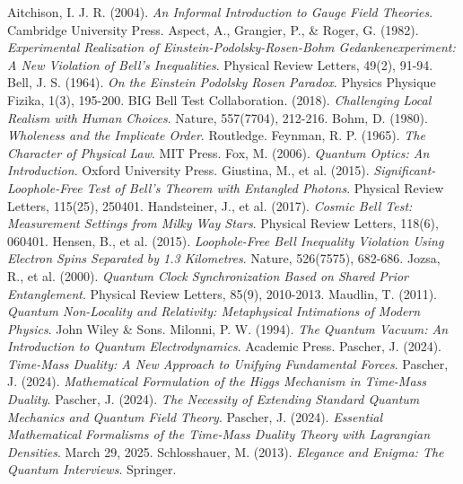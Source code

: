 \documentclass[12pt,a4paper]{article}
\begin{document}
	
	\begin{thebibliography}{99}
		 Aitchison, I. J. R. (2004). \textit{An Informal Introduction to Gauge Field Theories}. Cambridge University Press.
		 Aspect, A., Grangier, P., \& Roger, G. (1982). \textit{Experimental Realization of Einstein-Podolsky-Rosen-Bohm Gedankenexperiment: A New Violation of Bell's Inequalities}. Physical Review Letters, 49(2), 91-94.
		 Bell, J. S. (1964). \textit{On the Einstein Podolsky Rosen Paradox}. Physics Physique Fizika, 1(3), 195-200.
		 BIG Bell Test Collaboration. (2018). \textit{Challenging Local Realism with Human Choices}. Nature, 557(7704), 212-216.
		 Bohm, D. (1980). \textit{Wholeness and the Implicate Order}. Routledge.
		 Feynman, R. P. (1965). \textit{The Character of Physical Law}. MIT Press.
		 Fox, M. (2006). \textit{Quantum Optics: An Introduction}. Oxford University Press.
		 Giustina, M., et al. (2015). \textit{Significant-Loophole-Free Test of Bell's Theorem with Entangled Photons}. Physical Review Letters, 115(25), 250401.
		 Handsteiner, J., et al. (2017). \textit{Cosmic Bell Test: Measurement Settings from Milky Way Stars}. Physical Review Letters, 118(6), 060401.
		 Hensen, B., et al. (2015). \textit{Loophole-Free Bell Inequality Violation Using Electron Spins Separated by 1.3 Kilometres}. Nature, 526(7575), 682-686.
		 Jozsa, R., et al. (2000). \textit{Quantum Clock Synchronization Based on Shared Prior Entanglement}. Physical Review Letters, 85(9), 2010-2013.
		 Maudlin, T. (2011). \textit{Quantum Non-Locality and Relativity: Metaphysical Intimations of Modern Physics}. John Wiley \& Sons.
		 Milonni, P. W. (1994). \textit{The Quantum Vacuum: An Introduction to Quantum Electrodynamics}. Academic Press.
		 Pascher, J. (2024). \textit{Time-Mass Duality: A New Approach to Unifying Fundamental Forces}.
		 Pascher, J. (2024). \textit{Mathematical Formulation of the Higgs Mechanism in Time-Mass Duality}.
		 Pascher, J. (2024). \textit{The Necessity of Extending Standard Quantum Mechanics and Quantum Field Theory}.
		 Pascher, J. (2024). \textit{Essential Mathematical Formalisms of the Time-Mass Duality Theory with Lagrangian Densities}. March 29, 2025.
		 Schlosshauer, M. (2013). \textit{Elegance and Enigma: The Quantum Interviews}. Springer.

\end{thebibliography}
\end{document}
